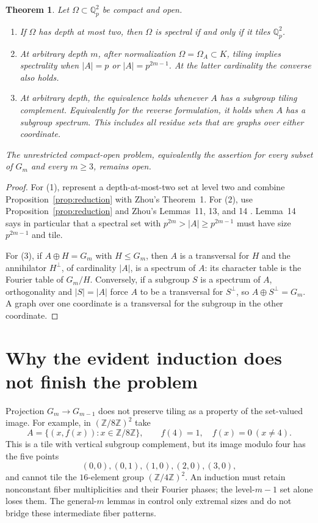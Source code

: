 \documentclass[11pt]{article}
\newtheorem{theorem}{Theorem}
\newcommand{\Qp}{\mathbb Q_p}
\newcommand{\Gm}{G_m}
\begin{document}
\begin{theorem}\label{thm:partial}
Let $\Omega\subset\Qp^2$ be compact and open.
\begin{enumerate}
\item If $\Omega$ has depth at most two, then $\Omega$ is spectral if and
only if it tiles $\Qp^2$.
\item At arbitrary depth $m$, after normalization $\Omega=\Omega_A\subset K$,
tiling implies spectrality when $|A|=p$ or $|A|=p^{2m-1}$.  At the latter
cardinality the converse also holds.
\item At arbitrary depth, the equivalence holds whenever $A$ has a subgroup
tiling complement.  Equivalently for the reverse formulation, it holds when
$A$ has a subgroup spectrum.  This includes all residue sets that are graphs
over either coordinate.
\end{enumerate}
The unrestricted compact-open problem, equivalently the assertion for every
subset of $\Gm$ and every $m\ge3$, remains open.
\end{theorem}

\begin{proof}
For (1), represent a depth-at-most-two set at level two and combine
Proposition~\ref{prop:reduction} with Zhou's Theorem~1.  For (2), use
Proposition~\ref{prop:reduction} and Zhou's Lemmas~11, 13, and 14
\cite[PDF pp.~11--12]{Zhou}.  Lemma~14 says in particular that a spectral set
with $p^{2m}>|A|\ge p^{2m-1}$ must have size $p^{2m-1}$ and tile.

For (3), if $A\oplus H=\Gm$ with $H\le\Gm$, then $A$ is a transversal for
$H$ and the annihilator $H^\perp$, of cardinality $|A|$, is a spectrum of
$A$: its character table is the Fourier table of $\Gm/H$.  Conversely, if a
subgroup $S$ is a spectrum of $A$, orthogonality and $|S|=|A|$ force $A$ to
be a transversal for $S^\perp$, so $A\oplus S^\perp=\Gm$.  A graph over one
coordinate is a transversal for the subgroup in the other coordinate.
\end{proof}

\section*{Why the evident induction does not finish the problem}

Projection $\Gm\to G_{m-1}$ does not preserve tiling as a property of the
set-valued image.  For example, in $(\mathbb Z/8\mathbb Z)^2$ take
\[
 A=\{(x,f(x)):x\in\mathbb Z/8\mathbb Z\},\qquad
 f(4)=1,\quad f(x)=0\ (x\ne4).
\]
This is a tile with vertical subgroup complement, but its image modulo four
has the five points
\[
 (0,0),(0,1),(1,0),(2,0),(3,0),
\]
and cannot tile the $16$-element group $(\mathbb Z/4\mathbb Z)^2$.
An induction must retain nonconstant fiber multiplicities and their Fourier
phases; the level-$m-1$ set alone loses them.  The general-$m$ lemmas in
\cite{Zhou} control only extremal sizes and do not bridge these intermediate
fiber patterns.
\end{document}

